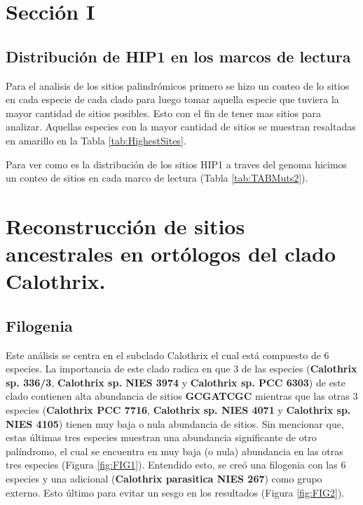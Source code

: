 \documentclass[
]{book}
\begin{document}
\hypertarget{secciuxf3n-i}{%
\chapter*{Sección I}\label{secciuxf3n-i}}

\hypertarget{distribuciuxf3n-de-hip1-en-los-marcos-de-lectura}{%
\section{Distribución de HIP1 en los marcos de lectura}\label{distribuciuxf3n-de-hip1-en-los-marcos-de-lectura}}

Para el analisis de los sitios palindrómicos primero se hizo un conteo de lo sitios en cada especie de cada clado para luego tomar aquella especie que tuviera la mayor cantidad de sitios posibles. Esto con el fin de tener mas sitios para analizar. Aquellas especies con la mayor cantidad de sitios se muestran resaltadas en amarillo en la Tabla \ref{tab:HighestSites}.

Para ver como es la distribución de los sitios HIP1 a traves del genoma hicimos un conteo de sitios en cada marco de lectura (Tabla \ref{tab:TABMuts2}).

\hypertarget{reconstrucciuxf3n-de-sitios-ancestrales-en-ortuxf3logos-del-clado-calothrix.}{%
\chapter{Reconstrucción de sitios ancestrales en ortólogos del clado Calothrix.}\label{reconstrucciuxf3n-de-sitios-ancestrales-en-ortuxf3logos-del-clado-calothrix.}}

\hypertarget{filogenia-1}{%
\section{Filogenia}\label{filogenia-1}}

Este análisis se centra en el subclado Calothrix el cual está compuesto de 6 especies. La importancia de este clado radica en que 3 de las especies (\textbf{Calothrix sp. 336/3}, \textbf{Calothrix sp. NIES 3974} y \textbf{Calothrix sp. PCC 6303}) de este clado contienen alta abundancia de sitios \textbf{GCGATCGC} mientras que las otras 3 especies (\textbf{Calothrix PCC 7716}, \textbf{Calothrix sp. NIES 4071} y \textbf{Calothrix sp. NIES 4105}) tienen muy baja o nula abundancia de sitios. Sin mencionar que, estas últimas tres especies muestran una abundancia significante de otro palíndromo, el cual se encuentra en muy baja (o nula) abundancia en las otras tres especies (Figura \ref{fig:FIG1}). Entendido esto, se creó una filogenia con las 6 especies y una adicional (\textbf{Calothrix parasitica NIES 267}) como grupo externo. Esto último para evitar un sesgo en los resultados (Figura \ref{fig:FIG2}).
\end{document}
